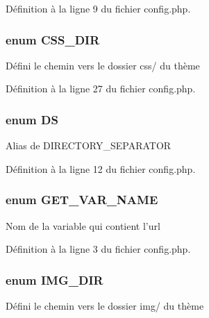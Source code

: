 Définition à la ligne 9 du fichier config.\-php.

\hypertarget{config_8php_a09748c20c209cc20be94d4681b442462}{
\subsubsection[{C\-S\-S\-\_\-\-D\-I\-R}]{\setlength{\rightskip}{0pt plus 5cm}enum {\bf C\-S\-S\-\_\-\-D\-I\-R}}}\label{config_8php_a09748c20c209cc20be94d4681b442462}
Défini le chemin vers le dossier css/ du thème 

Définition à la ligne 27 du fichier config.\-php.

\hypertarget{config_8php_a78edc178185545ab482d543f266866eb}{
\subsubsection[{D\-S}]{\setlength{\rightskip}{0pt plus 5cm}enum {\bf D\-S}}}\label{config_8php_a78edc178185545ab482d543f266866eb}
Alias de D\-I\-R\-E\-C\-T\-O\-R\-Y\-\_\-\-S\-E\-P\-A\-R\-A\-T\-O\-R 

Définition à la ligne 12 du fichier config.\-php.

\hypertarget{config_8php_ade5667635816e5abbe1edeac7581893e}{
\subsubsection[{G\-E\-T\-\_\-\-V\-A\-R\-\_\-\-N\-A\-M\-E}]{\setlength{\rightskip}{0pt plus 5cm}enum {\bf G\-E\-T\-\_\-\-V\-A\-R\-\_\-\-N\-A\-M\-E}}}\label{config_8php_ade5667635816e5abbe1edeac7581893e}
Nom de la variable qui contient l'url 

Définition à la ligne 3 du fichier config.\-php.

\hypertarget{config_8php_a632b7eb8132b844ff697126db5aecd87}{
\subsubsection[{I\-M\-G\-\_\-\-D\-I\-R}]{\setlength{\rightskip}{0pt plus 5cm}enum {\bf I\-M\-G\-\_\-\-D\-I\-R}}}\label{config_8php_a632b7eb8132b844ff697126db5aecd87}
Défini le chemin vers le dossier img/ du thème 

